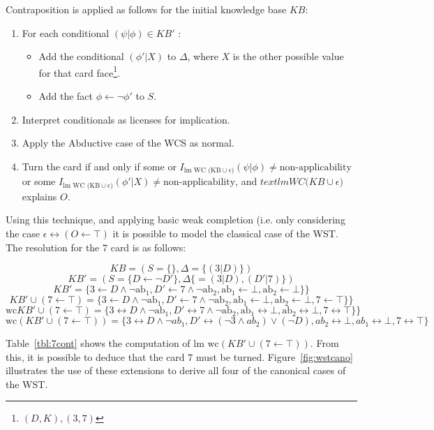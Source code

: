 Contraposition is applied as follows for the initial knowledge base $KB$:
\begin{enumerate}
\item For each conditional $(\psi|\phi)\in KB'$ :
\begin{itemize}
\item Add the conditional $(\phi'|X)$ to $\Delta$, where $X$ is the other possible value for that card face\footnote{$(D,K),(3,7)$}.
\item Add the fact $\phi\leftarrow \lnot \phi'$ to $S$.
\end{itemize}
\item Interpret conditionals as licenses for implication.
\item Apply the Abductive case of the WCS as normal.
\item Turn the card if and only if some or $I_{\text{lm WC (KB} \cup \epsilon)}(\psi|\phi)\neq\textrm{non-applicability}$ or some $I_{\text{lm WC (KB} \cup \epsilon)}(\phi'|X)\neq\textrm{non-applicability}$, and $text{lm WC (KB} \cup \epsilon)$ explains $O$.
\end{enumerate}

Using this technique, and applying basic weak completion (i.e. only considering the case $\epsilon\leftrightarrow(O\leftarrow \top)$ it is possible to model the classical case of the WST. The resolution for the $7$ card is as follows:

\[
KB = (S=\{\},\Delta=\{(3|D)\})
\]
\[
KB' = (S=\{D \leftarrow  \lnot D'\},\Delta\{=(3|D),(D'|7)\})
\]
\[
KB' = \{3 \leftarrow D \land \lnot \text{ab}_1, D' \leftarrow 7 \land \lnot \text{ab}_2, \text{ab}_1 \leftarrow \bot, \text{ab}_2 \leftarrow \bot\}\}
\]
\[
KB'\cup (7\leftarrow\top) = \{3 \leftarrow D \land \lnot \text{ab}_1, D' \leftarrow 7 \land \lnot \text{ab}_2, \text{ab}_1 \leftarrow \bot, \text{ab}_2 \leftarrow \bot, 7 \leftarrow \top\}\}
\]
\[
\text{wc}KB'\cup (7\leftarrow\top) = \{3 \leftrightarrow D \land \lnot \text{ab}_1, D' \leftrightarrow 7 \land \lnot \text{ab}_2, \text{ab}_1 \leftrightarrow \bot, \text{ab}_2 \leftrightarrow \bot, 7 \leftrightarrow \top\}\}
\]
\begin{equation} \label{eqn:wst_contra}
\textrm{wc} (KB'\cup (7\leftarrow\top)) = \{3 \leftrightarrow D \land \lnot ab_1, D' \leftrightarrow (\lnot 3 \land ab_2) \lor (\lnot D),  ab_2\leftrightarrow \bot, ab_1\leftrightarrow \bot, 7\leftrightarrow\top \}
\end{equation}

Table~\ref{tbl:7cont} shows the computation of $\textrm{lm wc} (KB'\cup (7\leftarrow\top))$. From this, it is possible to deduce that the card $7$ must be turned. Figure~\ref{fig:wstcano} illustrates the use of these extensions to derive all four of the canonical cases of the WST.

